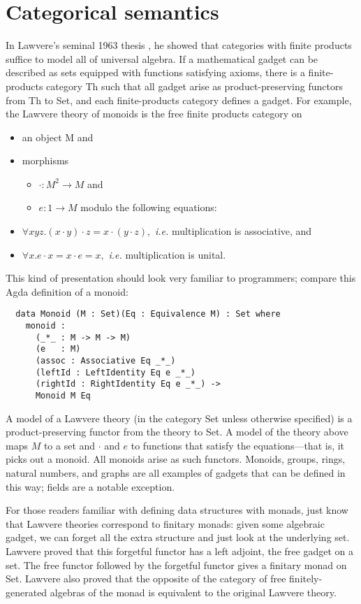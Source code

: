 \documentclass[submission,copyright,creativecommons]{eptcs}
\newcommand{\maps}{\colon}
\begin{document}
\section{Categorical semantics}

In Lawvere's seminal 1963 thesis \cite{Lawvere}, he showed that categories with finite products suffice to model all of universal algebra.  If a mathematical gadget can be described as sets equipped with functions satisfying axioms, there is a finite-products category Th such that all gadget arise as product-preserving functors from Th to Set, and each finite-products category defines a gadget.  For example, the Lawvere theory of monoids is the free finite products category on
\begin{itemize}
  \item an object M and
  \item morphisms 
  \begin{itemize}
    \item $\cdot\maps M^2 \to M$ and
    \item $e\maps 1 \to M$ modulo the following equations:
  \end{itemize}
  \item $\forall xyz.(x\cdot y)\cdot z = x\cdot(y\cdot z),$ {\em i.e.} multiplication is associative, and
  \item $\forall x.e \cdot x = x\cdot e = x,$ {\em i.e.} multiplication is unital.
\end{itemize}
This kind of presentation should look very familiar to programmers; compare this Agda definition of a monoid:
\begin{verbatim}
  data Monoid (M : Set)(Eq : Equivalence M) : Set where
    monoid :
      (_*_ : M -> M -> M)
      (e   : M)
      (assoc : Associative Eq _*_)
      (leftId : LeftIdentity Eq e _*_)
      (rightId : RightIdentity Eq e _*_) ->
      Monoid M Eq
\end{verbatim}

A model of a Lawvere theory (in the category Set unless otherwise specified) is a product-preserving functor from the theory to Set.  A model of the theory above maps $M$ to a set and $\cdot$ and $e$ to functions that satisfy the equations---that is, it picks out a monoid.  All monoids arise as such functors. Monoids, groups, rings, natural numbers, and graphs are all examples of gadgets that can be defined in this way; fields are a notable exception.  

For those readers familiar with defining data structures with monads, just know that Lawvere theories correspond to finitary monads: given some algebraic gadget, we can forget all the extra structure and just look at the underlying set.  Lawvere proved that this forgetful functor has a left adjoint, the free gadget on a set.  The free functor followed by the forgetful functor gives a finitary monad on Set.  Lawvere also proved that the opposite of the category of free finitely-generated algebras of the monad is equivalent to the original Lawvere theory.
\end{document}
